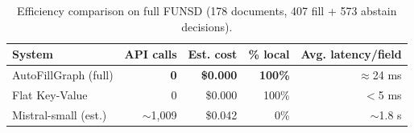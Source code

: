 \begin{table}[t]
\centering
\caption{Efficiency comparison on full FUNSD (178 documents, 407 fill + 573 abstain decisions).}
\label{tab:efficiency}
\begin{tabular}{lrrrr}
\toprule
\textbf{System} & \textbf{API calls} & \textbf{Est. cost} & \textbf{\% local} & \textbf{Avg. latency/field} \\
\midrule
AutoFillGraph (full) & \textbf{0} & \textbf{\$0.000} & \textbf{100\%} & $\approx$24 ms \\
Flat Key-Value       &           0 & \$0.000           & 100\%           & $<$5 ms \\
Mistral-small (est.) & $\sim$1{,}009 & \$0.042         & 0\%            & $\sim$1.8 s \\
\bottomrule
\end{tabular}
\end{table}